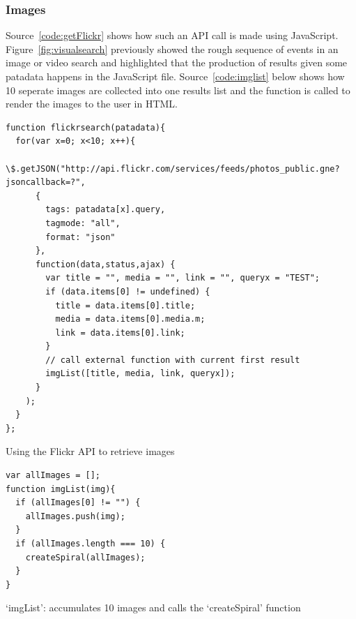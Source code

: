 

\subsubsection{Images}

Source~\ref{code:getFlickr} shows how such an \ac{API} call is made using JavaScript. Figure~\ref{fig:visualsearch} previously showed the rough sequence of events in an image or video search and highlighted that the production of results given some patadata happens in the  JavaScript file. Source~\ref{code:imglist} below shows how 10 seperate images are collected into one results list and the  function is called to render the images to the user in HTML.

\begin{listing}
  \begin{verbatim}
function flickrsearch(patadata){
  for(var x=0; x<10; x++){
    \$.getJSON("http://api.flickr.com/services/feeds/photos_public.gne?jsoncallback=?",
      {
        tags: patadata[x].query,
        tagmode: "all",
        format: "json"
      },
      function(data,status,ajax) {
        var title = "", media = "", link = "", queryx = "TEST";
        if (data.items[0] != undefined) {
          title = data.items[0].title;
          media = data.items[0].media.m;
          link = data.items[0].link;
        }
        // call external function with current first result
        imgList([title, media, link, queryx]);
      }
    );
  }
};
  \end{verbatim}
\caption[Flickr API call]{Using the Flickr API to retrieve images}
\label{code:getFlickr}
\end{listing}

\begin{listing}
  \begin{verbatim}
var allImages = [];
function imgList(img){
  if (allImages[0] != "") {
    allImages.push(img);
  }
  if (allImages.length === 10) {
    createSpiral(allImages);
  }
}
  \end{verbatim}
\caption[`imgList' function]{`imgList': accumulates 10 images and calls the `createSpiral' function}
\label{code:imglist}
\end{listing}

